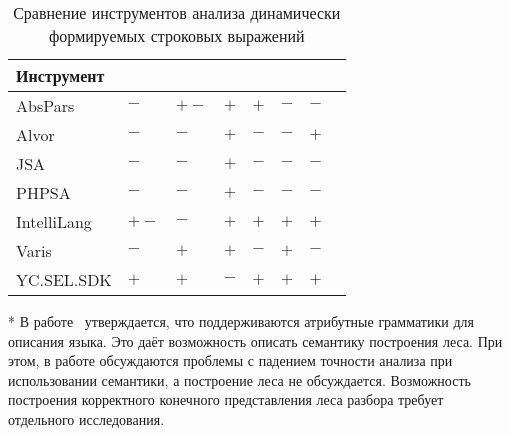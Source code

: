\begin{table} [htbp]
  \centering
\parbox{14cm}{\caption{Сравнение инструментов анализа динамически формируемых строковых выражений}\label{tbl:comparison}}
\begin{threeparttable}
  
  \begin{tabular}{| p{2.7cm} || p{2.4cm} | p{1.6cm} | p{1.6cm} | p{1.6cm} | p{2.2cm} | p{2.4cm}l |}
  \hline                               
  \hline
  {Инструмент}   &\centering {Платформа} &\centering {Лес разбора}      &\centering {Синт. ошибки} &\centering {Сем. ошибки} &\centering {Подсветка} &\centering {Модульность} & \\
  \hline 
  AbsPars      &\centering  $-$      &\centering  $+-$\tnote{*}                 &\centering  $+$                  &\centering  $+$                 &\centering  $-$                 &\centering  $-$        & \\
  Alvor        &\centering  $-$      &\centering  $-$                    &\centering  $+$                  &\centering  $-$                 &\centering  $-$                 &\centering  $+$        &\\
  JSA          &\centering  $-$      &\centering  $-$                    &\centering  $+$                  &\centering  $-$                 &\centering  $-$                 &\centering  $-$        &\\
  PHPSA        &\centering  $-$      &\centering  $-$                    &\centering  $+$                  &\centering  $-$                 &\centering  $-$                 &\centering  $-$        &\\
  IntelliLang  &\centering  $+-$\tnote{*}   &\centering  $-$                    &\centering  $+$                  &\centering  $+$                 &\centering  $+$                 &\centering  $+$        &\\
  Varis        &\centering  $-$      &\centering  $+$\tnote{***}                  &\centering  $+$                  &\centering  $-$                 &\centering  $+$                 &\centering  $-$        &\\
  YC.SEL.SDK   &\centering  $+$      &\centering  $+$                    &\centering  $-$\tnote{****}                &\centering  $+$                 &\centering  $+$                 &\centering  $+$        &\\
  \hline
  \hline
  \end{tabular}
  \begin{tablenotes}
            \item[*] \small{В работе~\cite{LRAbstractParsingSema} утверждается, что поддерживаются атрибутные грамматики для описания языка. Это даёт возможность описать семантику построения леса. При этом, в работе обсуждаются проблемы с падением точности анализа при использовании семантики, а построение леса не обсуждается. Возможность построения корректного конечного представления леса разбора требует отдельного исследования.}

\end{tablenotes}
\end{threeparttable}
\end{table}
